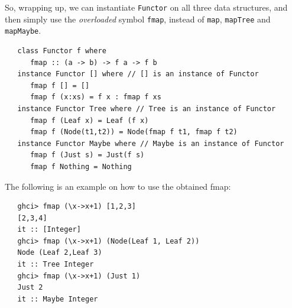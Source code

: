 So, wrapping up, we can instantiate \lstinline|Functor| on all three data structures,
and then simply use the \textit{overloaded} symbol \lstinline|fmap|, instead of \lstinline|map|, \lstinline|mapTree| and \lstinline|mapMaybe|.
\begin{lstlisting}
   class Functor f where
      fmap :: (a -> b) -> f a -> f b
   instance Functor [] where // [] is an instance of Functor
      fmap f [] = []
      fmap f (x:xs) = f x : fmap f xs
   instance Functor Tree where // Tree is an instance of Functor
      fmap f (Leaf x) = Leaf (f x)
      fmap f (Node(t1,t2)) = Node(fmap f t1, fmap f t2)
   instance Functor Maybe where // Maybe is an instance of Functor
      fmap f (Just s) = Just(f s)
      fmap f Nothing = Nothing
\end{lstlisting}


The following is an example on how to use the obtained fmap:
\begin{lstlisting}
   ghci> fmap (\x->x+1) [1,2,3]
   [2,3,4]
   it :: [Integer]
   ghci> fmap (\x->x+1) (Node(Leaf 1, Leaf 2))
   Node (Leaf 2,Leaf 3)
   it :: Tree Integer
   ghci> fmap (\x->x+1) (Just 1)
   Just 2
   it :: Maybe Integer
\end{lstlisting}

